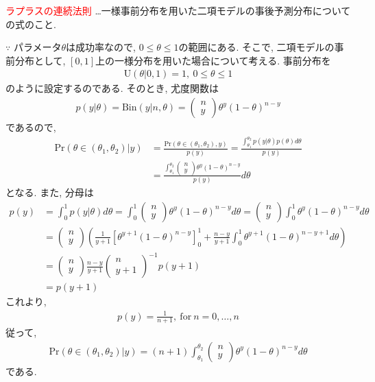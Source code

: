 \documentclass[11pt,a4pape,dvipdfmx]{jarticle}
\newcommand{\eqn}[1]{\begin{align*}#1\end{align*}}
\newcommand{\tcr}[1]{\textcolor{red}{#1}}
\begin{document}
\begin{itembox}[l]{\tcr{ラプラスの連続法則}}
…一様事前分布を用いた二項モデルの事後予測分布についての式のこと.
\end{itembox}
$\because$
パラメータ$\theta$は成功率なので, $0\leq \theta \leq 1$の範囲にある.
そこで, 二項モデルの事前分布として, $[0,1]$上の一様分布を用いた場合について考える.
事前分布を
\eqn{\text{U}(\theta|0,1)=1,\ 0\leq \theta\leq 1}
のように設定するのである.
そのとき, 尤度関数は
\eqn{p(y|\theta)=\text{Bin}(y|n,\theta)=\left(\begin{array}{c}n\\y\end{array}\right)\theta^y(1-\theta)^{n-y}}
であるので,
\eqn{\text{Pr}(\theta\in(\theta_1,\theta_2)|y)
&=\frac{\text{Pr}(\theta\in(\theta_1,\theta_2),y)}{p(y)}=\frac{\int_{\theta_1}^{\theta_2}p(y|\theta)p(\theta)d\theta}{p(y)}\\
&=\frac{\int_{\theta_1}^{\theta_2}\left(\begin{array}{c}n\\y\end{array}\right)\theta^y(1-\theta)^{n-y}}{p(y)}d\theta}
となる.
また, 分母は
\eqn{p(y)
&=\int_0^1 p(y|\theta)d\theta=\int_0^1\left(\begin{array}{c}n\\y\end{array}\right)\theta^y(1-\theta)^{n-y}d\theta=\left(\begin{array}{c}n\\y\end{array}\right) \int_0^1 \theta^y (1-\theta)^{n-y}d\theta\\
&=\left(\begin{array}{c}n\\y\end{array}\right) \left( \frac{1}{y+1}\left[\theta^{y+1}(1-\theta)^{n-y}\right]_0^1+\frac{n-y}{y+1} \int_0^1\theta^{y+1}(1-\theta)^{n-y+1}d\theta\right)\\
&=\left(\begin{array}{c}n\\y\end{array}\right) \frac{n-y}{y+1} \left(\begin{array}{c}n\\y+1\end{array}\right)^{-1} p(y+1)\\
&=p(y+1)}
これより,
\eqn{p(y)=\frac{1}{n+1},\ \text{for}\ n=0,\dots,n}
従って,
\eqn{\text{Pr}(\theta\in(\theta_1,\theta_2)|y)
=(n+1)\int_{\theta_1}^{\theta_2}\left(\begin{array}{c}n\\y\end{array}\right)\theta^y(1-\theta)^{n-y}d\theta}
である.
\end{document}
